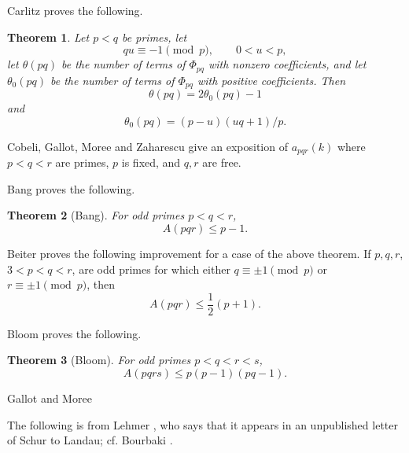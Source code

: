 \documentclass{article}
\newtheorem{theorem}{Theorem}
\theoremstyle{definition}
\begin{document}
Carlitz \cite{carlitz1966} proves the following.

\begin{theorem}
Let $p<q$ be primes,
let
\[
qu \equiv -1 \pmod{p},\qquad 0<u<p,
\]
let 
$\theta(pq)$ be the number of terms of $\Phi_{pq}$ with nonzero coefficients,
and
let $\theta_0(pq)$ be the number of terms of $\Phi_{pq}$ with positive coefficients.
Then
\[
\theta(pq) = 2\theta_0(pq)-1
\]
and
\[
\theta_0(pq) = (p-u)(uq+1)/p.
\]
\end{theorem}

Cobeli, Gallot, Moree and Zaharescu \cite{cobeli} give an exposition of $a_{pqr}(k)$ where $p<q<r$ are primes,
$p$ is fixed, and $q,r$ are free.






Bang \cite{bang} proves the following.

\begin{theorem}[Bang]
For odd primes $p<q<r$,
\[
A(pqr) \leq p-1.
\] 
\end{theorem}

Beiter \cite{beiter1968} proves the following improvement for a case of the above theorem.
If $p,q,r$, $3<p<q<r$, are odd primes for which
either $q \equiv \pm 1 \pmod{p}$ or $r \equiv \pm 1 \pmod{p}$, then
\[
A(pqr) \leq \frac{1}{2}(p+1).
\]



Bloom \cite{bloom} proves the following.

\begin{theorem}[Bloom]
For odd primes $p<q<r<s$,
\[
A(pqrs) \leq p(p-1)(pq-1).
\]
\end{theorem}

Gallot and Moree \cite{ternary}



The following is from Lehmer \cite{lehmer}, who says that it appears in an unpublished letter of Schur to Landau;
cf. Bourbaki \cite[V.~165, \S 11, Exercise 19]{bourbaki}.
\end{document}
